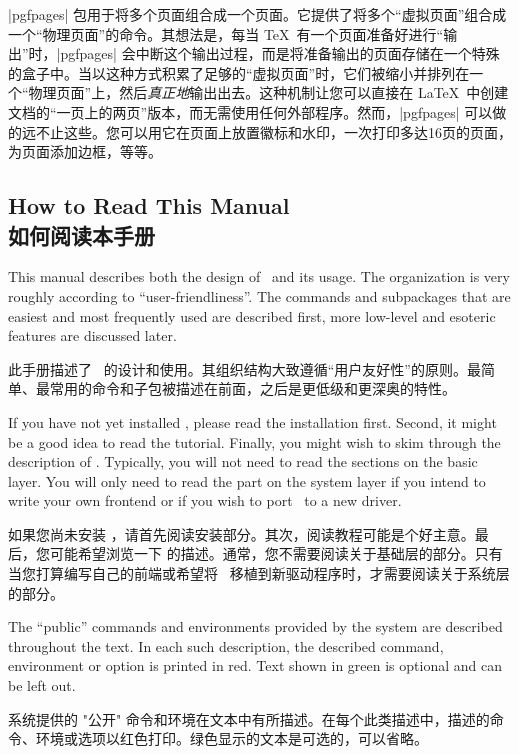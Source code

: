 \begin{paracol}{2}
\begin{enumerate}
        |pgfpages| 包用于将多个页面组合成一个页面。它提供了将多个“虚拟页面”组合成一个“物理页面”的命令。其想法是，每当 \TeX\ 有一个页面准备好进行“输出”时，|pgfpages| 会中断这个输出过程，而是将准备输出的页面存储在一个特殊的盒子中。当以这种方式积累了足够的“虚拟页面”时，它们被缩小并排列在一个“物理页面”上，然后\emph{真正地}输出出去。这种机制让您可以直接在 \LaTeX\ 中创建文档的“一页上的两页”版本，而无需使用任何外部程序。然而，|pgfpages| 可以做的远不止这些。您可以用它在页面上放置徽标和水印，一次打印多达16页的页面，为页面添加边框，等等。
\end{enumerate}



\subsection{How to Read This Manual\\如何阅读本手册}

This manual describes both the design of \tikzname\ and its usage. The
organization is very roughly according to ``user-friendliness''. The commands
and subpackages that are easiest and most frequently used are described first,
more low-level and esoteric features are discussed later.



此手册描述了 \tikzname\ 的设计和使用。其组织结构大致遵循“用户友好性”的原则。最简单、最常用的命令和子包被描述在前面，之后是更低级和更深奥的特性。


If you have not yet installed \tikzname, please read the installation first.
Second, it might be a good idea to read the tutorial. Finally, you might wish
to skim through the description of \tikzname. Typically, you will not need to
read the sections on the basic layer. You will only need to read the part on
the system layer if you intend to write your own frontend or if you wish to
port \pgfname\ to a new driver.

如果您尚未安装 \tikzname，请首先阅读安装部分。其次，阅读教程可能是个好主意。最后，您可能希望浏览一下 \tikzname 的描述。通常，您不需要阅读关于基础层的部分。只有当您打算编写自己的前端或希望将 \pgfname\ 移植到新驱动程序时，才需要阅读关于系统层的部分。

The ``public'' commands and environments provided by the system are described
throughout the text. In each such description, the described command,
environment or option is printed in red. Text shown in green is optional and
can be left out.

系统提供的 "公开" 命令和环境在文本中有所描述。在每个此类描述中，描述的命令、环境或选项以红色打印。绿色显示的文本是可选的，可以省略。





\end{paracol}
